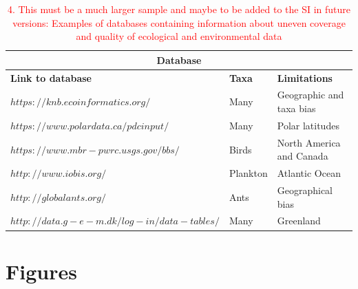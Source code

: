 \documentclass[12pt,a4paper]{article}
\begin{document}
\begin{table}[htbp]
	\centering
	\caption{\textcolor{red}{4. This must be a much larger sample and maybe to be added to the SI in future versions: Examples of databases containing information about
          uneven coverage and quality of ecological and environmental
          data}}
      \begin{tabular}{|l|l|l|}
                \hline
		\multicolumn{3}{|c|}{Database} \\
        \hline
               \textbf{Link to database} & \textbf{Taxa} & \textbf{Limitations} \\ \hline
		$https://knb.ecoinformatics.org/$ & Many & Geographic and taxa bias \\
		$https://www.polardata.ca/pdcinput/$ & Many & Polar latitudes \\
		$https://www.mbr-pwrc.usgs.gov/bbs/$ & Birds & North America and Canada \\
		$http://www.iobis.org/$ & Plankton & Atlantic Ocean \\
		$http://globalants.org/$ & Ants & Geographical bias \\
		$http://data.g-e-m.dk/log-in/data-tables/$ & Many & Greenland \\
		\bottomrule
	\end{tabular}%
	
	\label{tab:addlabel}%
\end{table}%

\newpage
    
\section{Figures}
\end{document}
